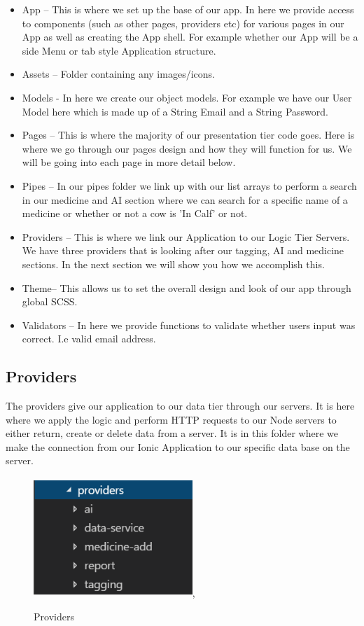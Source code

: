 \documentclass[12pt,a4paper,oneside,openany]{book}
\begin{document}
\begin{itemize}
    \item App – This is where we set up the base of our app. In here we provide access to components (such as other pages, providers etc) for various pages in our App as well as creating the App shell. For example whether our App will be a side Menu or tab style Application structure.
    \item Assets – Folder containing any images/icons.
    \item Models - In here we create our object models. For example we have our User Model here which is made up of a String Email and a String Password.
    \item Pages – This is where the majority of our presentation tier code goes. Here is where we go through our pages design and how they will function for us. We will be going into each page in more detail below.
    \item Pipes – In our pipes folder we link up with our list arrays to perform a search in our medicine and AI section where we can search for a specific name of a medicine or whether or not a cow is 'In Calf' or not.
    \item Providers – This is where we link our Application to our Logic Tier Servers. We have three providers that is looking after our tagging, AI and medicine sections. In the next section we will show you how we accomplish this.
    \item Theme– This allows us to set the overall design and look of our app through global SCSS.
    \item Validators – In here we provide functions to validate whether users input was correct. I.e valid email address.
\end{itemize}

\subsection{Providers}
The providers give our application to our data tier through our servers. It is here where we apply the logic and perform HTTP requests to our Node servers to either return, create or delete data from a server. It is in this folder where we make the connection from our Ionic Application to our specific data base on the server.

\begin{figure}[ht]
\renewcommand\thefigure{5.7}
\centering
\includegraphics[width=6cm,height=4.5cm]{Images/provider.png},
\caption{Providers}
\label{providers}
\end{figure}
\end{document}
